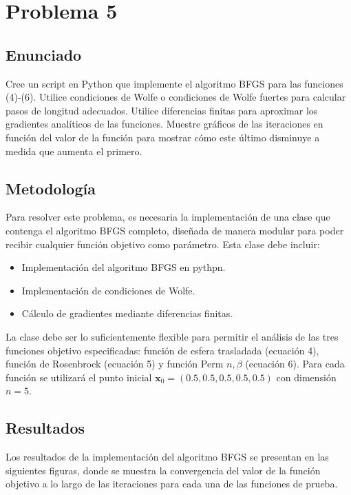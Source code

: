 \documentclass{article}
\begin{document}
\section{Problema 5}

\subsection{Enunciado}

Cree un script en Python que implemente el algoritmo BFGS para las funciones (4)-(6). Utilice condiciones de Wolfe o condiciones de Wolfe fuertes para calcular pasos de longitud adecuados. Utilice diferencias finitas para aproximar los gradientes analíticos de las funciones. Muestre gráficos de las iteraciones en función del valor de la función para mostrar cómo este último disminuye a medida que aumenta el primero.

\subsection{Metodología}

Para resolver este problema, es necesaria la implementación de una clase que contenga el algoritmo BFGS completo, diseñada de manera modular para poder recibir cualquier función objetivo como parámetro. Esta clase debe incluir:

\begin{itemize}
    \item Implementación del algoritmo BFGS en pythpn.
    \item Implementación de condiciones de Wolfe.
    \item Cálculo de gradientes mediante diferencias finitas.
\end{itemize}

La clase debe ser lo suficientemente flexible para permitir el análisis de las tres funciones objetivo especificadas: función de esfera trasladada (ecuación 4), función de Rosenbrock (ecuación 5) y función Perm $n,\beta$ (ecuación 6). Para cada función se utilizará el punto inicial $\mathbf{x}_0 = (0.5, 0.5, 0.5, 0.5, 0.5)$ con dimensión $n=5$.

\subsection{Resultados}
\setcounter{equation}{0}

Los resultados de la implementación del algoritmo BFGS se presentan en las siguientes figuras, donde se muestra la convergencia del valor de la función objetivo a lo largo de las iteraciones para cada una de las funciones de prueba.
\end{document}
